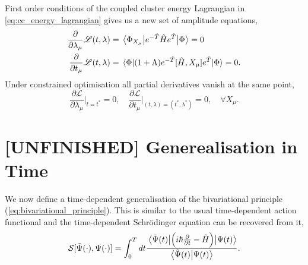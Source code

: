 First order conditions of the coupled cluster energy Lagrangian in
\autoref{eq:cc_energy_lagrangian} gives us a new set of amplitude equations,
\begin{align}
    \frac{\partial}{\partial \lambda_\mu} \mathscr{L}(t, \lambda)
    &= \mel{\Phi_{X_\mu}}{e^{-\hat{T}}\hat{H}e^{\hat{T}} }{\Phi} = 0 \\
    \frac{\partial}{\partial t_\mu} \mathscr{L}(t, \lambda)
    &= \mel{\Phi}{(1 + \Lambda)e^{-\hat{T}}[\hat{H}, X_\mu]e^{\hat{T}} }{\Phi} = 0.
\end{align}
Under constrained optimisation all partial derivatives vanish at the same point,
\begin{equation}
    \frac{\partial \mathscr{L}}{\partial \lambda_\mu}\Big\lvert_{t=t^*} = 0,
    \quad
    \frac{\partial \mathscr{L}}{\partial t_\mu}\Big\lvert_{(t,\lambda)=(t^*,\lambda^*)} = 0,
    \quad \forall X_\mu.
\end{equation}


\section{[UNFINISHED] Generealisation in Time}

We now define a time-dependent generalisation of the bivariational principle
(\autoref{eq:bivariational_principle}). This is similar to the usual time-dependent 
action functional and the time-dependent Schrödinger equation can be recovered from 
it,
\begin{equation}
    \mathcal{S}[\tilde{\Psi}(\cdot), \Psi(\cdot)]
        = \int_0^T dt \frac{\mel{\tilde{\Psi}(t)}{\left(
            i\hbar \frac{\partial}{\partial t} - \hat{H}
        \right)}{\Psi(t)}}{\braket{\tilde{\Psi}(t)}{\Psi(t)}}.
\end{equation}

